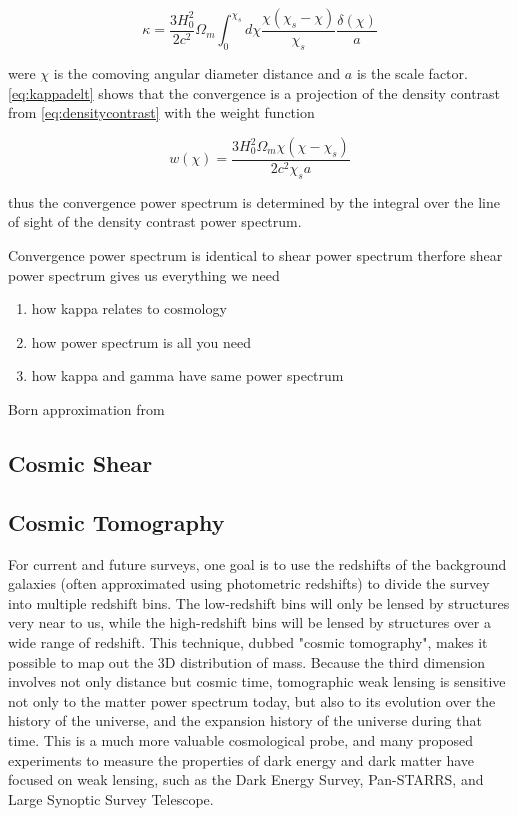 \begin{equation}
    \kappa = \frac{3H_0^2}{2c^2} \Omega_m \int_{0}^{\chi_s} d\chi  \frac{\chi (\chi_s-\chi)}{\chi_s} \frac{\delta(\chi)}{a}
    \label{eq:kappadelt}
\end{equation}

were $\chi$ is the comoving angular diameter distance and $a$ is the scale factor. \autoref{eq:kappadelt} shows that the convergence is a projection of the density contrast from \autoref{eq:densitycontrast} with the weight function 

\begin{equation}
    w(\chi) = \frac{3H_0^2 \Omega_m \chi (\chi - \chi_s)}{2 c^2 \chi_s a}
    \label{eq:weight}
\end{equation}

thus the convergence power spectrum is determined by the integral over the line of sight of the density contrast power spectrum\cite{Hoekstra:2013gua,rachel_2018,Bartelmann:2016dvf}.

Convergence power spectrum is identical to shear power spectrum therfore shear power spectrum gives us everything we need

\begin{enumerate}
    \item how kappa relates to cosmology
    \item how power spectrum is all you need 
    \item how kappa and gamma have same power spectrum
\end{enumerate}
Born approximation from \cite{Bartelmann:2016dvf}
\subsection{Cosmic Shear}

\subsection{Cosmic Tomography}
For current and future surveys, one goal is to use the redshifts of the background galaxies (often approximated using photometric redshifts) to divide the survey into multiple redshift bins. The low-redshift bins will only be lensed by structures very near to us, while the high-redshift bins will be lensed by structures over a wide range of redshift. This technique, dubbed "cosmic tomography", makes it possible to map out the 3D distribution of mass. Because the third dimension involves not only distance but cosmic time, tomographic weak lensing is sensitive not only to the matter power spectrum today, but also to its evolution over the history of the universe, and the expansion history of the universe during that time. This is a much more valuable cosmological probe, and many proposed experiments to measure the properties of dark energy and dark matter have focused on weak lensing, such as the Dark Energy Survey, Pan-STARRS, and Large Synoptic Survey Telescope.
\cite{lensingbook} \cite{rachel_2018} \cite{hoekstra}
